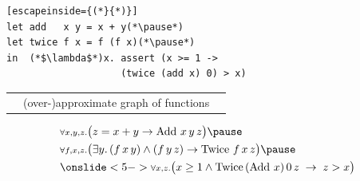 \documentclass{beamer}
\begin{document}
  


\begin{frame}[fragile]

  \vspace*{3mm}
  {\large 
    \begin{lstlisting}[escapeinside={(*}{*)}]
let add   x y = x + y(*\pause*)
let twice f x = f (f x)(*\pause*)
in  (*$\lambda$*)x. assert (x >= 1 ->
                    (twice (add x) 0) > x)
\end{lstlisting}
}
\pause
  \vspace{0.5cm}

  \renewcommand\tabularxcolumn[1]{m{#1}}
  \begin{tabularx}{\textwidth}{ RcL }
     &
    (over-)approximate graph of functions
    &
  \end{tabularx}
  \pause

  \Large
  \vspace{-0.2cm}
    \[
      \begin{array}{l}
        {\scriptstyle\forall x, y, z\ldotp\big(}z = x + y \to \Add\,  x \, y \, z {\scriptstyle\big)} \pause\\[4pt]
        {\scriptstyle\forall f, x,z\ldotp \big(} \exists y\ldotp
        (f \, x \, y)\land (f\,y\,z) \to \Twice \, f \, x\,z {\scriptstyle\big)} \pause\\[4pt]
        \onslide<5->{{\scriptstyle\forall x,z\ldotp \big (} x \geq 1 \wedge \Twice \, (\Add\,x) \, 0\,z\; \to \; z > x {\scriptstyle\big)}}
      \end{array}
    \]
    
\end{frame}
\end{document}
